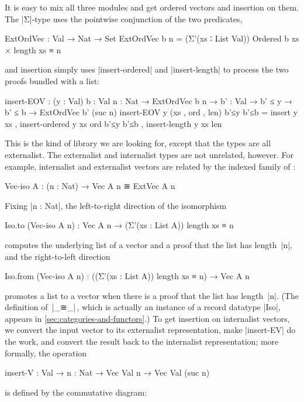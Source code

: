 It is easy to mix all three modules and get ordered vectors and insertion on them.
The |Σ|-type uses the pointwise conjunction of the two predicates,
\begin{code}
ExtOrdVec : Val → Nat → Set
ExtOrdVec b n = (Σ'(xs ∶ List Val)) Ordered b xs × length xs ≡ n
\end{code}
and insertion simply uses |insert-ordered| and |insert-length| to process the two proofs bundled with a list:
\begin{code}
insert-EOV :  (y : Val) {b : Val} {n : Nat} → ExtOrdVec b n →
              {b' : Val} → b' ≤ y → b' ≤ b → ExtOrdVec b' (suc n)
insert-EOV y (xs , ord , len) b'≤y b'≤b =  insert          y xs ,
                                           insert-ordered  y xs ord b'≤y b'≤b ,
                                           insert-length   y xs len
\end{code}
This is the kind of library we are looking for, except that the types are all externalist.
The externalist and internalist types are not unrelated, however.
For example, internalist and externalist vectors are related by the indexed family of :
\begin{code}
Vec-iso A : (n : Nat) → Vec A n ≅ ExtVec A n
\end{code}
Fixing |n : Nat|, the left-to-right direction of the isomorphism
\begin{code}
Iso.to (Vec-iso A n) : Vec A n → (Σ'(xs : List A)) length xs ≡ n
\end{code}
computes the underlying list of a vector and a proof that the list has length~|n|, and the right-to-left direction
\begin{code}
Iso.from (Vec-iso A n) : ((Σ'(xs : List A)) length xs ≡ n) → Vec A n
\end{code}
promotes a list to a vector when there is a proof that the list has length~|n|.
(The definition of~|_≅_|\,, which is actually an instance of a record datatype |Iso|, appears in \autoref{sec:categories-and-functors}.)
To get insertion on internalist vectors, we convert the input vector to its externalist representation, make |insert-EV| do the work, and convert the result back to the internalist representation; more formally, the operation
\begin{code}
insert-V : Val → {n : Nat} → Vec Val n → Vec Val (suc n)
\end{code}
is defined by the commutative diagram:
